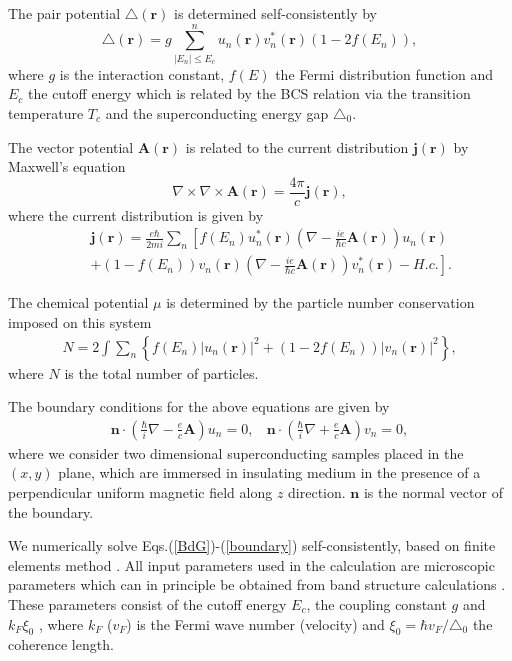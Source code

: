 \documentclass[aps,prl,showpacs,twocolumn]{revtex4}
\begin{document}
The pair potential $\triangle(\textbf{r})$ is determined
self-consistently by
\begin{equation}
 \triangle(\textbf{r})=g\sum^n_{|E_n|\leq E_c}u_n(\textbf{r})
 v_n^{*}(\textbf{r})(1-2f(E_n)),\label{delta}
\end{equation}
where $g$ is the interaction constant, $f(E)$ the Fermi distribution
function and $E_c$ the cutoff energy which is related by the BCS
relation via the transition temperature $T_c$ and the
superconducting energy gap $\triangle_0$.

The vector potential $\textbf{A}(\textbf{r})$ is related to the
current distribution $\textbf{j}(\textbf{r})$ by Maxwell's equation
\begin{equation}
\nabla\times\nabla\times\textbf{A}(\textbf{r})
=\frac{4\pi}{c}\textbf{j}(\textbf{r}),\label{maxwell}
\end{equation}
where the current distribution \cite{gennes,gygi} is given by
\begin{eqnarray}
&&\textbf{j}(\textbf{r})=\frac{e\hbar}{2mi}
\sum_n\left[f(E_n)u_n^*(\textbf{r})(\nabla-\frac{ie}{\hbar
c}\textbf{A}(\textbf{r}))u_n(\textbf{r})\right.\nonumber\\
&&\left.+(1-f(E_n))v_n(\textbf{r})(\nabla-\frac{ie}{\hbar
c}\textbf{A}(\textbf{r}))v_n^*(\textbf{r})
-H.c.\right].\label{current}
\end{eqnarray}

The chemical potential $\mu$ is determined by the particle number
conservation imposed on this system \cite{kato}
\begin{eqnarray}
N=2\int\sum_n\left\{f(E_n)|u_n(\textbf{r})|^2
+(1-2f(E_n))|v_n(\textbf{r})|^2\right\},\label{number}
\end{eqnarray}
where $N$ is the total number of particles.

The boundary conditions for the above equations are given by
\begin{eqnarray}
\textbf{n}\cdot
\left(\frac{\hbar}{i}\nabla-\frac{e}{c}\textbf{A}\right)u_n=0,\ \ \
\ \textbf{n}\cdot
\left(\frac{\hbar}{i}\nabla+\frac{e}{c}\textbf{A}\right)v_n=0\label{boundary},
\end{eqnarray}
where we consider two dimensional superconducting samples placed in
the $(x, y)$ plane, which are immersed in insulating medium in the
presence of a perpendicular uniform magnetic field along $z$
direction. $\textbf{n}$ is the normal vector of the boundary.



We numerically solve Eqs.(\ref{BdG})-(\ref{boundary})
self-consistently, based on finite elements method
\cite{zienkiewicz, suematsu}. All input parameters used in the
calculation are microscopic parameters which can in principle be
obtained from band structure calculations \cite{gygi}. These
parameters consist of the cutoff energy $E_c$, the coupling constant
$g$ and $k_F\xi_0$ \cite{hayashi}, where $k_F$ ($v_F$) is the Fermi
wave number (velocity) and $\xi_0=\hbar v_F/\triangle_0$ the
coherence length.
\end{document}
